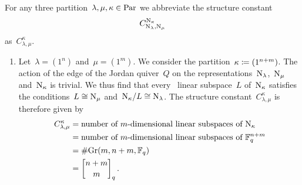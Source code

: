 \documentclass[a4paper,11pt]{scrartcl}
\begin{document}
\begin{example}
  For any three partition~$\lambda, \mu, \kappa \in \mathrm{Par}$ we abbreviate the structure constant
  \[
    C^{\mathrm{N}_{\kappa}}_{\mathrm{N}_{\lambda}, \mathrm{N}_{\mu}}
  \]
  as~$C^{\kappa}_{\lambda,\mu}$.
  \begin{enumerate}
    \item
      Let~$\lambda = (1^n)$ and~$\mu = (1^m)$.
      We consider the partition~$\kappa \coloneqq (1^{n+m})$.
      The action of the edge of the Jordan quiver~$Q$ on the representations~$\mathrm{N}_\lambda$,~$\mathrm{N}_\mu$ and~$\mathrm{N}_\kappa$ is trivial.
      We thus find that every~ linear subspace~$L$ of~$\mathrm{N}_{\kappa}$ satisfies the conditions~$L \cong \mathrm{N}_\mu$ and~$\mathrm{N}_\kappa / L \cong \mathrm{N}_\lambda$.
      The structure constant~$C^{\kappa}_{\lambda, \mu}$ is therefore given by
      \begin{align*}
        C^{\kappa}_{\lambda, \mu}
        &=
        \text{number of~\dimensional{$m$} linear subspaces of~$\Nil_{\kappa}$}
        \\
        &=
        \text{number of~\dimensional{$m$} linear subspaces of~$\Finite_q^{n+m}$}
        \\
        &=
        \counting {\Gr(m, n+m, \Finite_q)}
        \\
        &=
        \qbinomial{n+m}{m}_q \,.
      \end{align*}


\end{enumerate}
\end{example}
\end{document}
